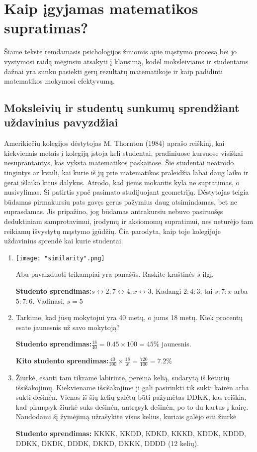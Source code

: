\documentclass{article}
\begin{document}
\section{Kaip įgyjamas matematikos supratimas?}

Šiame tekste remdamasis psichologijos žiniomis apie mąstymo procesą bei jo vystymosi raidą mėginsiu atsakyti į klausimą, kodėl moksleiviams ir studentams dažnai yra sunku pasiekti gerų rezultatų matematikoje ir kaip padidinti matematikos mokymosi efektyvumą.

\subsection{Moksleivių ir studentų sunkumų sprendžiant uždavinius pavyzdžiai}

Amerikiečių kolegijos dėstytojas M. Thornton (1984) aprašo reiškinį, kai kiekvienais metais į kolegiją įstoja keli studentai, pradiniuose kursuose visiškai nesuprantantys, kas vyksta matematikos paskaitose. Šie studentai neatrodo tingintys ar kvaili, kai kurie iš jų prie matematikos praleidžia labai daug laiko ir gerai išlaiko kitus dalykus. Atrodo, kad jiems mokantis kyla ne supratimas, o nusivylimas. Ši patirtis ypač pasimato studijuojant geometriją. Dėstytojas teigia būdamas pirmakursiu pats gavęs gerus pažymius daug atsimindamas, bet ne suprasdamas. Jis pripažino, jog būdamas antrakursiu nebuvo pasiruošęs deduktiniam samprotavimui, įrodymų ir aksiomomų supratimui, nes neturėjo tam reikiamų išvystytų mąstymo įgūdžių. Čia parodyta, kaip toje kolegijoje uždavinius sprendė kai kurie studentai.

\begin{framed}
\begin{enumerate}
\item \texttt{[image: "similarity".png]}

Abu pavaizduoti trikampiai yra panašūs. Raskite kraštinės $s$ ilgį.  

\textbf{Studento sprendimas:}$s \leftrightarrow 2, 7 \leftrightarrow 4, x \leftrightarrow 3$. Kadangi $2:4:3$, tai $s:7:x$ arba $5:7:6$. Vadinasi, $s=5$

\item Tarkime, kad jūsų mokytojui yra 40 metų, o jums 18 metų. Kiek procentų esate jaunesnis už savo mokytoją?

\textbf{Studento sprendimas:}$\frac{18}{40}=0.45\times 100=45\%$ jaunesnis.

\textbf{Kito studento sprendimas:}$\frac{40}{100}\times\frac{18}{x}=\frac{720}{100}=7.2\%$

\item Žiurkė, esanti tam tikrame labirinte, pereina kelią, sudarytą iš keturių išsišakojimų. Kiekviename išsišakojime ji gali pasirinkti tik sukti kairėn arba sukti dešinėn. Vienas iš šių kelių galėtų būti pažymėtas DDKK, kas reiškia, kad pirmąsyk žiurkė suks dešinėn, antrąsyk dešinėn, po to du kartus į kairę. Naudodami šį žymėjimą užrašykite visus kelius, kuriais galėjo eiti žiurkė

\textbf{Studento sprendimas:} KKKK, KKDD, KDKD, KKKD, KDDK, KDDD, DDKK, DKDK, DDDK, DKKD, DKKK, DDDD (12 kelių).
\end{enumerate}
\end{framed}
\end{document}
